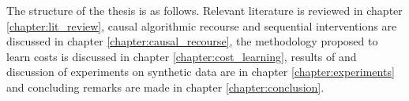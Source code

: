 The structure of the thesis is as follows. Relevant literature is reviewed in chapter \ref{chapter:lit_review}, causal algorithmic recourse and sequential interventions are discussed in chapter \ref{chapter:causal_recourse}, the methodology proposed to learn costs is discussed in chapter \ref{chapter:cost_learning}, results of and discussion of experiments on synthetic data are in chapter \ref{chapter:experiments} and concluding remarks are made in chapter \ref{chapter:conclusion}.









